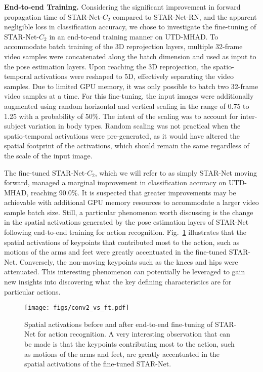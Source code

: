 \documentclass[10pt, conference, compsocconf]{IEEEtran}
\begin{document}
\smallskip\noindent\textbf{End-to-end Training.} Considering the significant improvement in forward propagation time of STAR-Net-$C_2$ compared to STAR-Net-RN, and the apparent negligible loss in classification accuracy, we chose to investigate the fine-tuning of STAR-Net-$C_2$ in an end-to-end training manner on UTD-MHAD. To accommodate batch training of the 3D reprojection layers, multiple 32-frame video samples were concatenated along the batch dimension and used as input to the pose estimation layers. Upon reaching the 3D reprojection, the spatio-temporal activations were reshaped to 5D, effectively separating the video samples. Due to limited GPU memory, it was only possible to batch two 32-frame video samples at a time. For this fine-tuning, the input images were additionally augmented using random horizontal and vertical scaling in the range of 0.75 to 1.25 with a probability of 50\%. The intent of the scaling was to account for inter-subject variation in body types. Random scaling was not practical when the spatio-temporal activations were pre-generated, as it would have altered the spatial footprint of the activations, which should remain the same regardless of the scale of the input image.



The fine-tuned STAR-Net-$C_2$, which we will refer to as simply STAR-Net moving forward, managed a marginal improvement in classification accuracy on UTD-MHAD, reaching 90.0\%. It is suspected that greater improvements may be achievable with additional GPU memory resources to accommodate a larger video sample batch size. Still, a particular phenomenon worth discussing is the change in the spatial activations generated by the pose estimation layers of STAR-Net following end-to-end training for action recognition. Fig.~\ref{fig:conv2_vs_starnet} illustrates that the spatial activations of keypoints that contributed most to the action, such as motions of the arms and feet were greatly accentuated in the fine-tuned STAR-Net. Conversely, the non-moving keypoints such as the knees and hips were attenuated. This interesting phenomenon can potentially be leveraged to gain new insights into discovering what the key defining characteristics are for particular actions.

\begin{figure}
    \centering
    \texttt{[image: figs/conv2\_vs\_ft.pdf]}
    \vspace{-15pt}
\caption{Spatial activations before and after end-to-end fine-tuning of STAR-Net for action recognition. A very interesting observation that can be made is that the keypoints contributing most to the action, such as motions of the arms and feet, are greatly accentuated in the spatial activations of the fine-tuned STAR-Net.}
    \label{fig:conv2_vs_starnet}
    \vspace{-5pt}
\end{figure}
\end{document}
